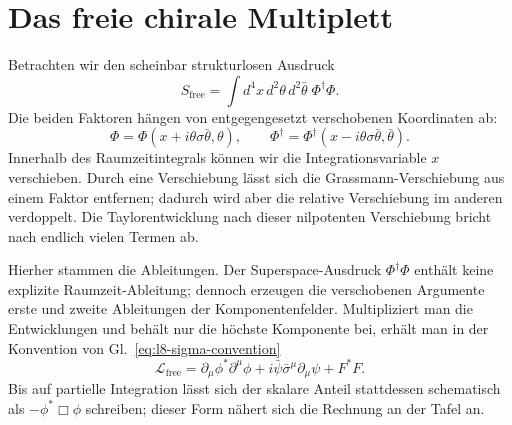 \section{Das freie chirale Multiplett}

Betrachten wir den scheinbar strukturlosen Ausdruck
\begin{equation}
S_{\mathrm{free}}
=\int d^4x\,d^2\theta\,d^2\bar\theta\;
\Phi^\dagger\Phi.
\label{eq:l8-free-superaction}
\end{equation}
Die beiden Faktoren hängen von entgegengesetzt verschobenen Koordinaten ab:
\begin{equation}
\Phi=\Phi(x+i\theta\sigma\bar\theta,\theta),
\qquad
\Phi^\dagger
=\Phi^\dagger(x-i\theta\sigma\bar\theta,\bar\theta).
\end{equation}
Innerhalb des Raumzeitintegrals können wir die Integrationsvariable \(x\) verschieben. Durch eine Verschiebung lässt sich die Grassmann-Verschiebung aus einem Faktor entfernen; dadurch wird aber die relative Verschiebung im anderen verdoppelt. Die Taylorentwicklung nach dieser nilpotenten Verschiebung bricht nach endlich vielen Termen ab.

Hierher stammen die Ableitungen. Der Superspace-Ausdruck
\(\Phi^\dagger\Phi\) enthält keine explizite Raumzeit-Ableitung; dennoch erzeugen die verschobenen Argumente erste und zweite Ableitungen der Komponentenfelder. Multipliziert man die Entwicklungen und behält nur die höchste Komponente bei, erhält man in der Konvention von Gl.~\eqref{eq:l8-sigma-convention}
\begin{equation}
\mathcal L_{\mathrm{free}}
=\partial_\mu\phi^\ast\partial^\mu\phi
+i\bar\psi\bar\sigma^\mu\partial_\mu\psi
+F^\ast F.
\label{eq:l8-free-component-lagrangian}
\end{equation}
Bis auf partielle Integration lässt sich der skalare Anteil stattdessen schematisch als \(-\phi^\ast\Box\phi\) schreiben; dieser Form nähert sich die Rechnung an der Tafel an.

\begin{classroomqa}
\end{classroomqa}

\begin{classroomqa}
\end{classroomqa}

